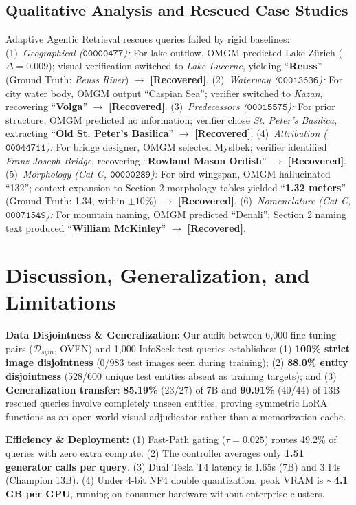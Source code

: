 \documentclass[conference]{IEEEtran}
\begin{document}
\subsection{Qualitative Analysis and Rescued Case Studies}
Adaptive Agentic Retrieval rescues queries failed by rigid baselines:
(1)~\textit{Geographical ($\mathtt{00000477}$):} For lake outflow, OMGM predicted Lake Z{\"u}rich ($\Delta = 0.009$); visual verification switched to \textit{Lake Lucerne}, yielding ``\textbf{Reuss}'' (Ground Truth: \textit{Reuss River}) $\to$ \textbf{[Recovered]}.
(2)~\textit{Waterway ($\mathtt{00013636}$):} For city water body, OMGM output ``Caspian Sea''; verifier switched to \textit{Kazan}, recovering ``\textbf{Volga}'' $\to$ \textbf{[Recovered]}.
(3)~\textit{Predecessors ($\mathtt{00015575}$):} For prior structure, OMGM predicted no information; verifier chose \textit{St. Peter's Basilica}, extracting ``\textbf{Old St. Peter's Basilica}'' $\to$ \textbf{[Recovered]}.
(4)~\textit{Attribution ($\mathtt{00044711}$):} For bridge designer, OMGM selected Myslbek; verifier identified \textit{Franz Joseph Bridge}, recovering ``\textbf{Rowland Mason Ordish}'' $\to$ \textbf{[Recovered]}.
(5)~\textit{Morphology (Cat C, $\mathtt{00000289}$):} For bird wingspan, OMGM hallucinated ``132''; context expansion to Section 2 morphology tables yielded ``\textbf{1.32 meters}'' (Ground Truth: 1.34, within $\pm 10\%$) $\to$ \textbf{[Recovered]}.
(6)~\textit{Nomenclature (Cat C, $\mathtt{00071549}$):} For mountain naming, OMGM predicted ``Denali''; Section 2 naming text produced ``\textbf{William McKinley}'' $\to$ \textbf{[Recovered]}.


\section{Discussion, Generalization, and Limitations}

\textbf{Data Disjointness \& Generalization:} Our audit between 6,000 fine-tuning pairs ($\mathcal{D}_{sym}$, OVEN) and 1,000 InfoSeek test queries establishes: (1) \textbf{100\% strict image disjointness} (0/983 test images seen during training); (2) \textbf{88.0\% entity disjointness} (528/600 unique test entities absent as training targets); and (3) \textbf{Generalization transfer}: \textbf{85.19\%} (23/27) of 7B and \textbf{90.91\%} (40/44) of 13B rescued queries involve completely unseen entities, proving symmetric LoRA functions as an open-world visual adjudicator rather than a memorization cache.

\textbf{Efficiency \& Deployment:}
(1) Fast-Path gating ($\tau = 0.025$) routes 49.2\% of queries with zero extra compute.
(2) The controller averages only \textbf{1.51 generator calls per query}.
(3) Dual Tesla T4 latency is 1.65s (7B) and 3.14s (Champion 13B).
(4) Under 4-bit NF4 double quantization, peak VRAM is $\sim$\textbf{4.1\,GB per GPU}, running on consumer hardware without enterprise clusters.
\end{document}
